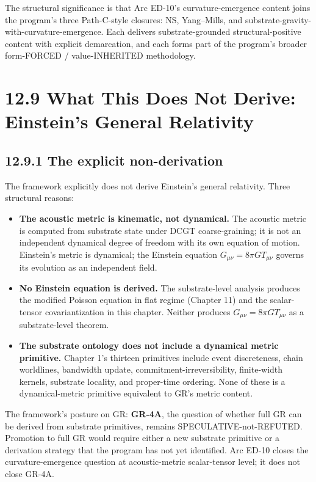 \documentclass[11pt]{book}
\begin{document}
The structural significance is that Arc ED-10's curvature-emergence content joins the program's three Path-C-style closures: NS, Yang–Mills, and substrate-gravity-with-curvature-emergence. Each delivers substrate-grounded structural-positive content with explicit demarcation, and each forms part of the program's broader form-FORCED / value-INHERITED methodology.

\section{12.9 What This Does Not Derive: Einstein's General Relativity}

\subsection{12.9.1 The explicit non-derivation}

The framework explicitly does not derive Einstein's general relativity. Three structural reasons:

\begin{itemize}
\item \textbf{The acoustic metric is kinematic, not dynamical.} The acoustic metric is computed from substrate state under DCGT coarse-graining; it is not an independent dynamical degree of freedom with its own equation of motion. Einstein's metric is dynamical; the Einstein equation $G_{\mu\nu} = 8\pi G T_{\mu\nu}$ governs its evolution as an independent field.
\item \textbf{No Einstein equation is derived.} The substrate-level analysis produces the modified Poisson equation in flat regime (Chapter 11) and the scalar-tensor covariantization in this chapter. Neither produces $G_{\mu\nu} = 8\pi G T_{\mu\nu}$ as a substrate-level theorem.
\item \textbf{The substrate ontology does not include a dynamical metric primitive.} Chapter 1's thirteen primitives include event discreteness, chain worldlines, bandwidth update, commitment-irreversibility, finite-width kernels, substrate locality, and proper-time ordering. None of these is a dynamical-metric primitive equivalent to GR's metric content.
\end{itemize}

The framework's posture on GR: \textbf{GR-4A}, the question of whether full GR can be derived from substrate primitives, remains SPECULATIVE-not-REFUTED. Promotion to full GR would require either a new substrate primitive or a derivation strategy that the program has not yet identified. Arc ED-10 closes the curvature-emergence question at acoustic-metric scalar-tensor level; it does not close GR-4A.
\end{document}
